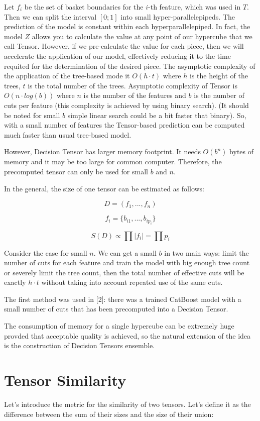 \documentclass[a4paper]{jpconf}
\begin{document}
Let $f_i$ be the set of basket boundaries for the $i$-th feature, which was used in $T$. Then we can split the interval $[0;1]$ into small hyper-parallelepipeds. The prediction of the model is constant within each hyperparallelepiped. In fact, the model $Z$ allows you to calculate the value at any point of our hypercube that we call Tensor. However, if we pre-calculate the value for each piece, then we will accelerate the application of our model, effectively reducing it to the time requited for the determination of the desired piece. The asymptotic complexity of the application of the tree-based mode it $O(h\cdot t)$ where $h$ is the height of the trees, $t$ is the total number of the trees. Asymptotic complexity of Tensor is $O(n\cdot log(b))$ where $n$ is the number of the features and $b$ is the number of cuts per feature (this complexity is achieved by using binary search). (It should be noted for small $b$ simple linear search could be a bit faster that binary). So, with a small number of features the Tensor-based prediction can be computed much faster than usual tree-based model.

However, Decision Tensor has larger memory footprint. It needs $O(b^n)$ bytes of memory and it may be too large for common computer. Therefore, the precomputed tensor can only be used for small $b$ and $n$.

In the general, the size of one tensor can be estimated as follows:

$$D = (f_{1}, ..., f_{n})$$

$$f_{i} = \{b_{i1}, ..., b_{ip_{i}}\}$$

$$S(D) \propto \prod |f_{i}| = \prod p_i$$

Consider the case for small $n$. We can get a small $b$ in two main ways: limit the number of cuts for each feature and train the model with big enough tree count or severely limit the tree count, then the total number of effective cuts will be exactly $h\cdot t$ without taking into account repeated use of the same cuts.

The first method was used in [2]: there was a trained CatBoost model with a small number of cuts that has been precomputed into a Decision Tensor.

The consumption of memory for a single hypercube can be extremely huge provded that acceptable quality is achieved, so the natural extension of the idea is the construction of Decision Tensors ensemble.

\section{Tensor Similarity}
Let's introduce the metric for the similarity of two tensors. Let's define it as the difference between the sum of their sizes and the size of their union:
\end{document}

